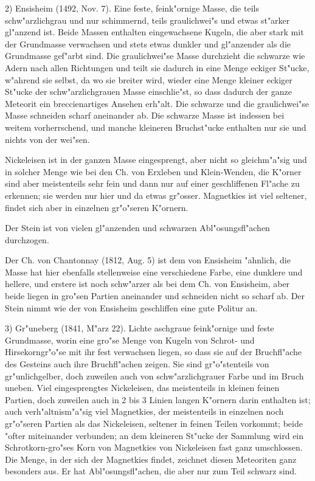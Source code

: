 \documentclass[a4paper, 11pt, oneside, german]{article}
\begin{document}
2) Ensisheim (1492, Nov. 7). Eine feste, feink"ornige Masse, die teils schw"arzlichgrau und nur schimmernd, teils graulichwei"s und etwas st"arker gl"anzend ist. Beide Massen enthalten eingewachsene Kugeln, die aber stark mit der Grundmasse verwachsen und stets etwas dunkler und gl"anzender als die Grundmasse gef"arbt sind. Die graulichwei"se Masse durchzieht die schwarze wie Adern nach allen Richtungen und teilt sie dadurch in eine Menge eckiger St"ucke, w"ahrend sie selbst, da wo sie breiter wird, wieder eine Menge kleiner eckiger St"ucke der schw"arzlichgrauen Masse einschlie"st, so dass dadurch der ganze Meteorit ein breccienartiges Ansehen erh"alt. Die schwarze und die graulichwei"se Masse schneiden scharf aneinander ab. Die schwarze Masse ist indessen bei weitem vorherrschend, und manche kleineren Bruchst"ucke enthalten nur sie und nichts von der wei"sen.

Nickeleisen ist in der ganzen Masse eingesprengt, aber nicht so gleichm"a"sig und in solcher Menge wie bei den Ch. von Erxleben und Klein-Wenden, die K"orner sind aber meistenteils sehr fein und dann nur auf einer geschliffenen Fl"ache zu erkennen; sie werden nur hier und da etwas gr"osser. Magnetkies ist viel seltener, findet sich aber in einzelnen gr"o"seren K"ornern.

Der Stein ist von vielen gl"anzenden und schwarzen Abl"osungsfl"achen durchzogen.

Der Ch. von Chantonnay (1812, Aug. 5) ist dem von Ensisheim "ahnlich, die Masse hat hier ebenfalls stellenweise eine verschiedene Farbe, eine dunklere und hellere, und erstere ist noch schw"arzer als bei dem Ch. von Ensisheim, aber beide liegen in gro"sen Partien aneinander und schneiden nicht so scharf ab. Der Stein nimmt wie der von Ensisheim geschliffen eine gute Politur an.

3) Gr"uneberg (1841, M"arz 22). Lichte aschgraue feink"ornige und feste Grundmasse, worin eine gro"se Menge von Kugeln von Schrot- und Hirsekorngr"o"se mit ihr fest verwachsen liegen, so dass sie auf der Bruchfl"ache des Gesteins auch ihre Bruchfl"achen zeigen. Sie sind gr"o"stenteils von gr"unlichgelber, doch zuweilen auch von schw"arzlichgrauer Farbe und im Bruch uneben. Viel eingesprengtes Nickeleisen, das meistenteils in kleinen feinen Partien, doch zuweilen auch in 2 bis 3 Linien langen K"ornern darin enthalten ist; auch verh"altnism"a"sig viel Magnetkies, der meistenteils in einzelnen noch gr"o"seren Partien als das Nickeleisen, seltener in feinen Teilen vorkommt; beide "ofter miteinander verbunden; an dem kleineren St"ucke der Sammlung wird ein Schrotkorn-gro"ses Korn von Magnetkies von Nickeleisen fast ganz umschlossen. Die Menge, in der sich der Magnetkies findet, zeichnet diesen Meteoriten ganz besonders aus. Er hat Abl"osungsfl"achen, die aber nur zum Teil schwarz sind.
\end{document}
